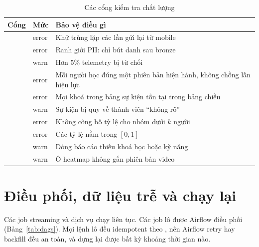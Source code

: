 \begin{table}[H]
\centering\small
\caption{Các cổng kiểm tra chất lượng}\label{tab:dq}
\begin{tabularx}{\textwidth}{@{}L{5.6cm}L{1.6cm}Y@{}}
\toprule
\textbf{Cổng} & \textbf{Mức} & \textbf{Bảo vệ điều gì} \\
\midrule
{} & error & Khử trùng lặp các lần gửi lại từ mobile \\
 & error & Ranh giới PII: chỉ bút danh sau bronze \\
 & warn & Hơn 5\% telemetry bị từ chối \\
 & error & Mỗi người học đúng một phiên bản hiện hành, không chồng lấn hiệu lực \\
 & error & Mọi khoá trong bảng sự kiện tồn tại trong bảng chiều \\
 & warn & Sự kiện bị quy về thành viên ``không rõ'' \\
 & error & Không công bố tỷ lệ cho nhóm dưới $k$ người \\
 & error & Các tỷ lệ nằm trong $[0, 1]$ \\
 & warn & Dòng báo cáo thiếu khoá học hoặc kỹ năng \\
 & warn & Ô heatmap không gắn phiên bản video \\
\bottomrule
\end{tabularx}
\end{table}

\section{Điều phối, dữ liệu trễ và chạy lại}
\label{sec:late}

Các job streaming và dịch vụ chạy liên tục. Các job lô được Airflow điều phối (Bảng~\ref{tab:dags}). Mọi lệnh lô đều idempotent theo , nên Airflow retry hay backfill đều an toàn, và  dựng lại được bất kỳ khoảng thời gian nào.

